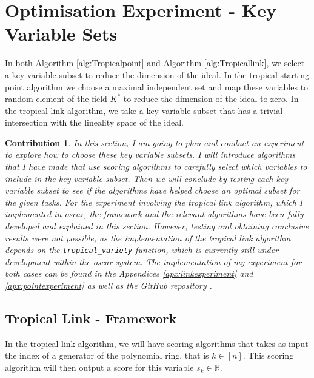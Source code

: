 \documentclass[11pt,reqno,a4paper]{article}
\theoremstyle{theoremstyle}
\theoremstyle{examplestyle}
\newtheorem*{contribution*}{Contribution}
\theoremstyle{algorithmstyle}
\numberwithin{equation}{subsection}
\newcommand{\RR}{\mathbb{R}}
\begin{document}
\section{Optimisation Experiment - Key Variable Sets}
In both Algorithm \ref{alg:Tropicalpoint} and Algorithm \ref{alg:Tropicallink}, we select a key variable subset to reduce the dimension of the ideal. In the tropical starting point algorithm we choose a maximal independent set and map these variables to random element of the field $K^*$ to reduce the dimension of the ideal to zero. In the tropical link algorithm, we take a key variable subset that has a trivial intersection with the lineality space of the ideal. 

\begin{contribution*}
In this section, I am going to plan and conduct an experiment to explore how to choose these key variable subsets. I will introduce algorithms that I have made that use scoring algorithms to carefully select which variables to include in the key variable subset. Then we will conclude by testing each key variable subset to see if the algorithms have helped choose an optimal subset for the given tasks. For the experiment involving the tropical link algorithm, which I implemented in {\sc oscar}, the framework and the relevant algorithms have been fully developed and explained in this section. However, testing and obtaining conclusive results were not possible, as the implementation of the tropical link algorithm depends on the \verb|tropical_variety| function, which is currently still under development within the {\sc oscar} system. The implementation of my experiment for both cases can be found in the Appendices \ref{apx:linkexperiment} and \ref{apx:pointexperiment} as well as the GitHub repository \cite{LinksGitHub}.

\end{contribution*}

\subsection{Tropical Link - Framework}
In the tropical link algorithm, we will have scoring algorithms that takes as input the index of a generator of the polynomial ring, that is $k \in [n]$. This scoring algorithm will then output a score for this variable $s_k \in \RR$.
\end{document}

